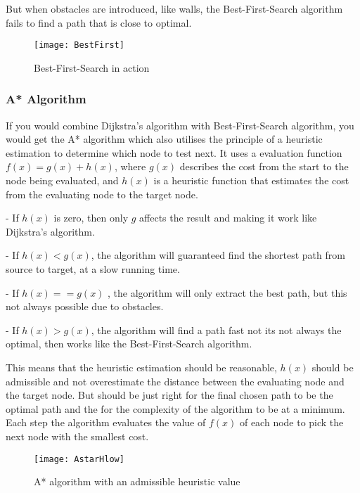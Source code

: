   But when obstacles are introduced, like walls, the Best-First-Search algorithm fails to find a path that is close to optimal.

  \begin{figure}[ht!]
    \centering
    \texttt{[image: BestFirst]} 
    \caption{Best-First-Search in action}
    \label{bestfirst}
  \end{figure}

  \subsubsection{A* Algorithm}

  If you would combine Dijkstra's algorithm with Best-First-Search algorithm, you would get the A* algorithm which also utilises the principle of a heuristic estimation to determine which node to test next. It uses a evaluation function $f(x) = g(x) + h(x)$, where $g(x)$ describes the cost from the start to the node being evaluated, and $h(x)$ is a heuristic function that estimates the cost from the evaluating node to the target node. \cite{http://theory.stanford.edu/}

  - If $h(x)$ is zero, then only $g$ affects the result and making it work like Dijkstra's algorithm.

  - If $h(x) < g(x)$, the algorithm will guaranteed find the shortest path from source to target, at a slow running time.

  - If $h(x) == g(x)$ , the algorithm will only extract the best path, but this not always possible due to obstacles.

  - If $h(x) > g(x)$, the algorithm will find a path fast not its not always the optimal, then works like the Best-First-Search algorithm.

  This means that the heuristic estimation should be reasonable, $h(x)$ should be admissible and not overestimate the distance between the evaluating node and the target node. But should be just right for the final chosen path to be the optimal path and the for the complexity of the algorithm to be at a minimum. Each step the algorithm evaluates the value of $f(x)$ of each node to pick the next node with the smallest cost.

  \begin{figure}[ht!]
    \centering
    \texttt{[image: AstarHlow]}
    \caption{A* algorithm with an admissible heuristic value}
    \label{astar}
  \end{figure}

